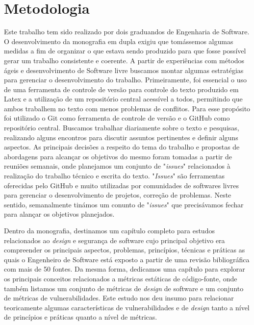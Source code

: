 \section{Metodologia}
\label{sec:methodology}

Este trabalho tem sido realizado por dois graduandos de Engenharia de Software.
%
O desenvolvimento da monografia em dupla exigiu que tomássemos algumas medidas a fim de organizar o que estava sendo produzido para que fosse possível gerar um trabalho consistente e coerente. A partir de experiências com métodos ágeis e desenvolvimento de Software livre buscamos montar algumas estratégias para gerenciar o desenvolvimento do trabalho. Primeiramente, foi essencial o uso de uma ferramenta de controle de versão para controle do texto produzido em Latex e a utilização de um repositório central acessível a todos, permitindo que ambos trabalhem no texto com menos problemas de conflitos. Para esse propósito foi utilizado o Git como ferramenta de controle de versão e o GitHub como repositório central. Buscamos trabalhar diariamente sobre o texto e pesquisas, realizando alguns encontros para discutir assuntos pertinentes e definir alguns aspectos. As principais decisões a respeito do tema do trabalho e propostas de abordagens para alcançar os objetivos do mesmo foram tomadas a partir de reuniões semanais, onde planejamos um conjunto de "\emph{issues}" relacionados à realização do trabalho técnico e escrita do texto. "\emph{Issues}" são ferramentas oferecidas pelo GitHub e muito utilizadas por comunidades de softwares livres para gerenciar o desenvolvimento de projetos, correção de problemas. Neste sentido, semanalmente tinámos um conunto de "\emph{issues}" que precisávamos fechar para alançar os objetivos planejados.

Dentro da monografia, destinamos um capítulo completo para estudos relacionados ao \emph{design} e segurança de software cujo principal objetivo era compreender os principais aspectos, problemas, princípios, técnicas e práticas as quais o Engenheiro de Software está exposto a partir de uma revisão bibliográfica com mais de 50 fontes. Da mesma forma, dedicamos uma capítulo para explorar os principais conceitos relacionados a métricas estáticas de código-fonte, onde também listamos um conjunto de métricas de \emph{design} de software e um conjunto de métricas de vulnerabilidades. Este estudo nos deu insumo para relacionar teoricamente algumas características de vulnerabilidades e de \emph{design} tanto a nível de princípios e práticas quanto a nível de métricas.

